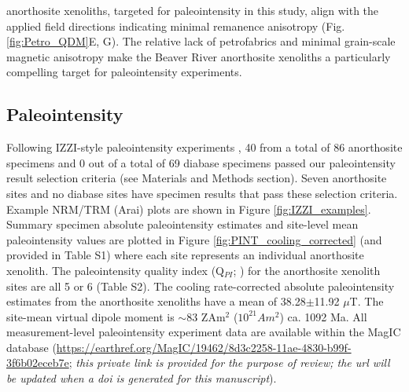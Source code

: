 \documentclass[9pt,twocolumn,twoside,lineno]{pnas-new}
\begin{document}
anorthosite xenoliths, targeted for paleointensity in this study, align with the applied field directions indicating minimal remanence anisotropy  (Fig. \ref{fig:Petro_QDM}E, G). The relative lack of petrofabrics and minimal grain-scale magnetic anisotropy make the Beaver River anorthosite xenoliths a particularly compelling target for paleointensity experiments.




\subsection*{Paleointensity}

Following IZZI-style paleointensity experiments \cite{Yu2004a}, 40 from a total of 86 anorthosite specimens and 0 out of a total of 69 diabase specimens passed our paleointensity result selection criteria (see Materials and Methods section). Seven anorthosite sites and no diabase sites have specimen results that pass these selection criteria. Example NRM/TRM (Arai) plots are shown in Figure \ref{fig:IZZI_examples}. Summary specimen absolute paleointensity estimates and site-level mean paleointensity values are plotted in Figure \ref{fig:PINT_cooling_corrected} (and provided in Table S1) where each site represents an individual anorthosite xenolith. The paleointensity quality index (Q$_{PI}$; \citealp{Biggin2014a}) for the anorthosite xenolith sites are all 5 or 6 (Table S2). The cooling rate-corrected absolute paleointensity estimates from the anorthosite xenoliths have a mean of 38.28$\pm$11.92 $\mu$T. The site-mean virtual dipole moment is $\sim$83 ZAm$^2$ ($10^{21} Am^2$) ca. 1092 Ma. All measurement-level paleointensity experiment data are available within the MagIC database (\url{https://earthref.org/MagIC/19462/8d3c2258-11ae-4830-b99f-3f6b02eceb7e}; \textit{this private link is provided for the purpose of review; the url will be updated when a doi is generated for this manuscript}). 
\end{document}
